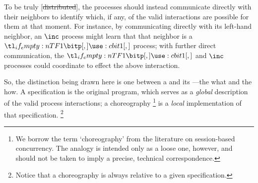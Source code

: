 \documentclass[
  class=../hdeyoung-proposal,
  crop=false
]{standalone}
\begin{document}
To be truly [\st{distributed}], the processes should instead communicate directly with their neighbors to identify which, if any, of the valid interactions are possible for them at that moment.
For instance, by communicating directly with its left-hand neighbor, an $\inc$ process might learn that that neighbor is a $\bit{1}$ process; with further direct communication, the $\bit{1}$ and $\inc$ processes could coordinate to effect the above interaction.


So, the distinction being drawn here is one between a  and its ---the what and the how.
A specification is the original program, which serves as a \emph{global} description of the valid process interactions; a choreography%
\footnote{We borrow the term \enquote*{choreography} from the literature on session-based concurrency.
The analogy is intended only as a loose one, however, and should not be taken to imply a precise, technical correspondence.}
is a \emph{local} implementation of that specification.%
\footnote{Notice that a choreography is always relative to a given specification.}
\end{document}
